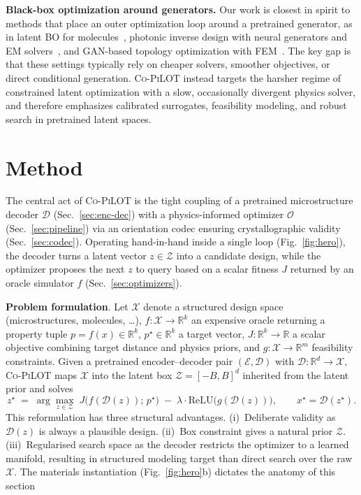 \documentclass{article}
\newcommand{\Co}{\textsc{Co-PiLOT}}
\newcommand{\Z}{\mathcal{Z}}
\newcommand{\X}{\mathcal{X}}
\newcommand{\Enc}{\mathcal{E}}
\newcommand{\Dec}{\mathcal{D}}
\newcommand{\Opt}{\mathcal{O}}
\newcommand{\R}{\mathbb{R}}
\begin{document}
\textbf{Black-box optimization around generators.} Our work is closest in spirit to methods that place an outer optimization loop around a pretrained generator, as in latent BO for molecules~\citep{gomez2018,tripp2020}, photonic inverse design with neural generators and EM solvers~\citep{Molesky2018,Zhou2021,Yeung2023}, and GAN-based topology optimization with FEM~\citep{nie2020,ParkKushwaha2024}. The key gap is that these settings typically rely on cheaper solvers, smoother objectives, or direct conditional generation. \Co{} instead targets the harsher regime of constrained latent optimization with a slow, occasionally divergent physics solver, and therefore emphasizes calibrated surrogates, feasibility modeling, and robust search in pretrained latent spaces.

\section{Method}
\label{sec:method}

The central act of \Co{} is the tight coupling of a pretrained microstructure decoder $\Dec$ (Sec.~\ref{sec:enc-dec}) with a physics-informed optimizer $\Opt$ (Sec.~\ref{sec:pipeline}) via an orientation codec ensuring crystallographic validity (Sec.~\ref{sec:codec}). Operating hand-in-hand inside a single loop (Fig.~\ref{fig:hero}), the decoder turns a latent vector $z{\in}\Z$ into a candidate design, while the optimizer proposes the next $z$ to query based on a scalar fitness $J$ returned by an oracle simulator $f$ (Sec.~\ref{sec:optimizers}).

\textbf{Problem formulation}. Let $\X$ denote a structured design space (microstructures, molecules, \dots), $f : \X \to \R^k$ an expensive oracle returning a property tuple $p = f(x) \in \R^k$, $p^\star \in \R^k$ a target vector, $J : \R^k \to \R$ a scalar objective combining target distance and physics priors, and $g : \X \to \R^m$ feasibility constraints. Given a pretrained encoder--decoder pair $(\Enc, \Dec)$ with $\Dec : \R^d \to \X$, \Co{} maps $\X$ into the latent box $\Z = [-B, B]^d$ inherited from the latent prior and solves
\begin{equation}
  z^\star \;=\; \arg\max_{z \in \Z}\; J\bigl(f(\Dec(z));\, p^\star\bigr)
                  \;-\; \lambda \cdot \mathrm{ReLU}\!\bigl(g(\Dec(z))\bigr),
  \qquad x^\star = \Dec(z^\star).
  \label{eq:latent-inverse-design}
\end{equation}
This reformulation has three structural advantages.
(i)~Deliberate validity as $\Dec(z)$ is always a plausible design.
(ii)~Box constraint gives a natural prior $\Z$.
(iii)~Regularised search space as the decoder restricts the optimizer to a learned manifold, resulting in structured modeling target than direct search over the raw $\X$. The materials instantiation (Fig.~\ref{fig:hero}b) dictates the anatomy of this section
\end{document}
